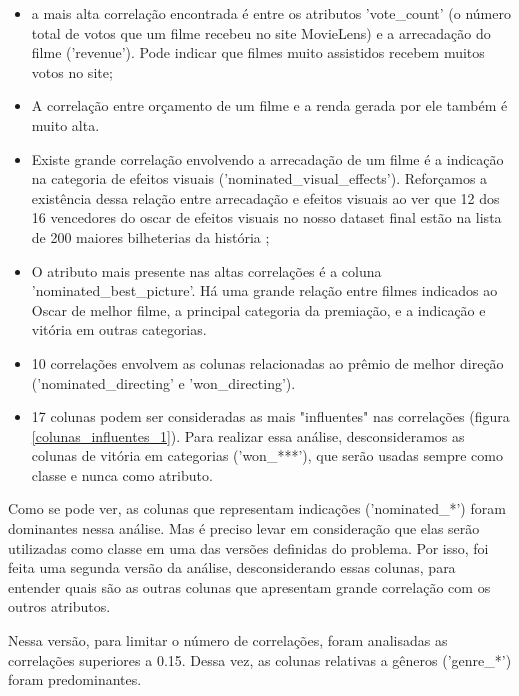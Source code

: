         \begin{itemize}

        \item a mais alta correlação encontrada é entre os atributos 'vote\_count' (o número total de votos que um filme recebeu no site MovieLens) e a arrecadação do filme ('revenue'). Pode indicar que filmes muito assistidos recebem muitos votos no site;
        
        \item A correlação entre orçamento de um filme e a renda gerada por ele também é muito alta.

        \item Existe grande correlação envolvendo a arrecadação de um filme é a indicação na categoria de efeitos visuais ('nominated\_visual\_effects'). Reforçamos a existência dessa relação entre arrecadação e efeitos visuais ao ver que 12 dos 16 vencedores do oscar de efeitos visuais no nosso dataset final estão na lista de 200 maiores bilheterias da história \cite{mojo2021};

        \item O atributo mais presente nas altas correlações é a coluna 'nominated\_best\_picture'. Há uma grande relação entre filmes indicados ao Oscar de melhor filme, a principal categoria da premiação, e a indicação e vitória em outras categorias.

        \item 10 correlações envolvem as colunas relacionadas ao prêmio de melhor direção ('nominated\_directing' e 'won\_directing').

        \item 17 colunas podem ser consideradas as mais "influentes" nas correlações (figura \ref{colunas_influentes_1}). Para realizar essa análise, desconsideramos as colunas de vitória em categorias ('won\_***'), que serão usadas sempre como classe e nunca como atributo.
        
        \end{itemize}
        
        Como se pode ver, as colunas que representam indicações ('nominated\_*') foram dominantes nessa análise. Mas é preciso levar em consideração que elas serão utilizadas como classe em uma das versões definidas do problema. Por isso, foi feita uma segunda versão da análise, desconsiderando essas colunas, para entender quais são as outras colunas que apresentam grande correlação com os outros atributos.
        
        Nessa versão, para limitar o número de correlações, foram analisadas as correlações superiores a 0.15. Dessa vez, as colunas relativas a gêneros ('genre\_*') foram predominantes.

